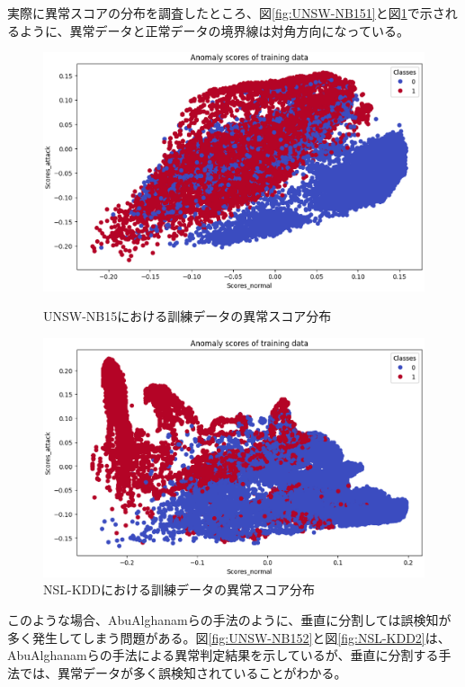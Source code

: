 \documentclass{css}
\begin{document}
実際に異常スコアの分布を調査したところ、図\ref{fig:UNSW-NB151}と図\ref{fig:NSL-KDD1}で示されるように、異常データと正常データの境界線は対角方向になっている。

\begin{figure}[ht]
    \centering
    \begin{minipage}{0.9\linewidth}
        \centering
        \includegraphics[width=\linewidth]{pictures/eps/UNSW-NB151.eps}
        \caption{UNSW-NB15における訓練データの異常スコア分布}
        \label{fig:UNSW-NB151}
    \end{minipage}
    \vfill{}
    \begin{minipage}{0.9\linewidth}
        \centering
        \includegraphics[width=\linewidth]{pictures/eps/NSL-KDD1.eps}
        \caption{NSL-KDDにおける訓練データの異常スコア分布}
        \label{fig:NSL-KDD1}
    \end{minipage}
\end{figure}

このような場合、AbuAlghanamらの手法\cite{AbuAlghanam2023-sx}のように、垂直に分割しては誤検知が多く発生してしまう問題がある。図\ref{fig:UNSW-NB152}と図\ref{fig:NSL-KDD2}は、AbuAlghanamらの手法による異常判定結果を示しているが、垂直に分割する手法では、異常データが多く誤検知されていることがわかる。
\end{document}
